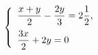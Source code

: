 \begin{ex}
	\begin{condition}
		\( \left\{
		\begin{array}{l}
			\dfrac{x+y}{2}-\dfrac{2y}{3}=2\dfrac{1}{2},\vspace{0,2cm}\\
			\dfrac{3x}{2}+2y=0
		\end{array}
		\right. \)
	\end{condition}
\end{ex}
